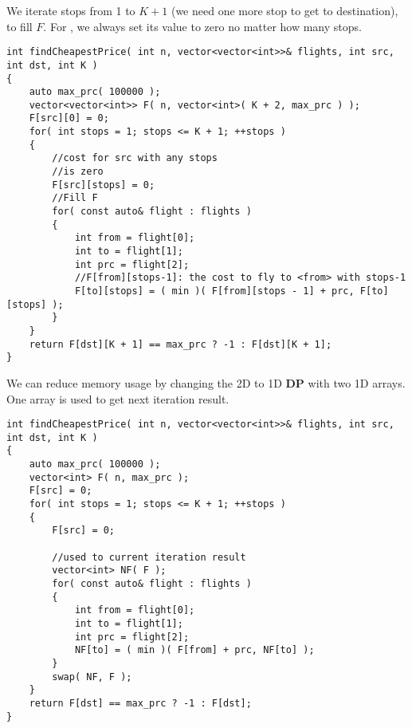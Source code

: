 We iterate stops from 1 to $K+1$ (we need one more stop to get to destination), to fill $F$. For , we always set its value to zero no matter how many stops.

\setcounter{lstlisting}{0}
\begin{lstlisting}[style=customc, caption={2D DP}]
int findCheapestPrice( int n, vector<vector<int>>& flights, int src, int dst, int K )
{
    auto max_prc( 100000 );
    vector<vector<int>> F( n, vector<int>( K + 2, max_prc ) );
    F[src][0] = 0;
    for( int stops = 1; stops <= K + 1; ++stops )
    {
        //cost for src with any stops
        //is zero
        F[src][stops] = 0;
        //Fill F
        for( const auto& flight : flights )
        {
            int from = flight[0];
            int to = flight[1];
            int prc = flight[2];
            //F[from][stops-1]: the cost to fly to <from> with stops-1
            F[to][stops] = ( min )( F[from][stops - 1] + prc, F[to][stops] );
        }
    }
    return F[dst][K + 1] == max_prc ? -1 : F[dst][K + 1];
}
\end{lstlisting}

We can reduce memory usage by changing the 2D to 1D \textbf{DP} with two 1D arrays. One array is used to get next iteration result.

\begin{lstlisting}[style=customc, caption={1D DP}]
int findCheapestPrice( int n, vector<vector<int>>& flights, int src, int dst, int K )
{
    auto max_prc( 100000 );
    vector<int> F( n, max_prc );
    F[src] = 0;
    for( int stops = 1; stops <= K + 1; ++stops )
    {
        F[src] = 0;

        //used to current iteration result
        vector<int> NF( F );
        for( const auto& flight : flights )
        {
            int from = flight[0];
            int to = flight[1];
            int prc = flight[2];
            NF[to] = ( min )( F[from] + prc, NF[to] );
        }
        swap( NF, F );
    }
    return F[dst] == max_prc ? -1 : F[dst];
}
\end{lstlisting}


